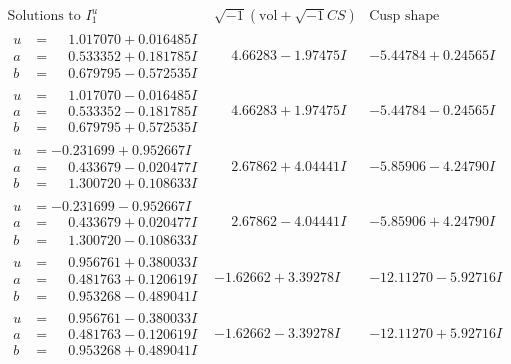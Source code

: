 \documentclass[1p]{elsarticle_modified}
\theoremstyle{definition}
\newcommand{\I}{\sqrt{-1}}
\begin{document}
$$\begin{array}{c|c|c}  
\text{Solutions to }I^u_{1}& \I (\text{vol} + \sqrt{-1}CS) & \text{Cusp shape}\\
 \hline 
\begin{aligned}
u &= \phantom{-}1.017070 + 0.016485 I \\
a &= \phantom{-}0.533352 + 0.181785 I \\
b &= \phantom{-}0.679795 - 0.572535 I\end{aligned}
 & \phantom{-}4.66283 - 1.97475 I & -5.44784 + 0.24565 I \\ \hline\begin{aligned}
u &= \phantom{-}1.017070 - 0.016485 I \\
a &= \phantom{-}0.533352 - 0.181785 I \\
b &= \phantom{-}0.679795 + 0.572535 I\end{aligned}
 & \phantom{-}4.66283 + 1.97475 I & -5.44784 - 0.24565 I \\ \hline\begin{aligned}
u &= -0.231699 + 0.952667 I \\
a &= \phantom{-}0.433679 - 0.020477 I \\
b &= \phantom{-}1.300720 + 0.108633 I\end{aligned}
 & \phantom{-}2.67862 + 4.04441 I & -5.85906 - 4.24790 I \\ \hline\begin{aligned}
u &= -0.231699 - 0.952667 I \\
a &= \phantom{-}0.433679 + 0.020477 I \\
b &= \phantom{-}1.300720 - 0.108633 I\end{aligned}
 & \phantom{-}2.67862 - 4.04441 I & -5.85906 + 4.24790 I \\ \hline\begin{aligned}
u &= \phantom{-}0.956761 + 0.380033 I \\
a &= \phantom{-}0.481763 + 0.120619 I \\
b &= \phantom{-}0.953268 - 0.489041 I\end{aligned}
 & -1.62662 + 3.39278 I & -12.11270 - 5.92716 I \\ \hline\begin{aligned}
u &= \phantom{-}0.956761 - 0.380033 I \\
a &= \phantom{-}0.481763 - 0.120619 I \\
b &= \phantom{-}0.953268 + 0.489041 I\end{aligned}
 & -1.62662 - 3.39278 I & -12.11270 + 5.92716 I \\ \hline\begin{aligned}

\end{aligned}
\end{array}$$
\end{document}

